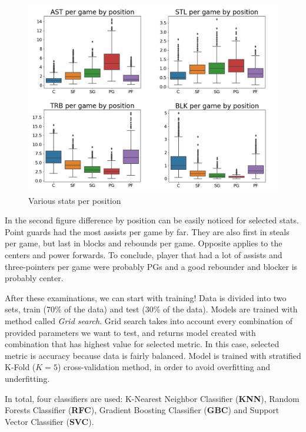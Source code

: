 \documentclass[a4paper]{article}
\begin{document}
\begin{figure}[h!]
\begin{center}
\includegraphics[width=1\textwidth]{per_pos_ast_stl_trb_blk.png}
\end{center}
\caption{Various stats per position}
\label{plt:pos_clf_data_boxplt2}
\end{figure}

In the second figure difference by position can be easily noticed for selected stats. Point guards had the most assists per game by far. They are also first in steals per game, but last in blocks and rebounds per game. Opposite applies to the centers and power forwards. To conclude, player that had a lot of assists and three-pointers per game were probably PGs and a good rebounder and blocker is probably center.

After these examinations, we can start with training! Data is divided into two sets, train (70\% of the data) and test (30\% of the data). Models are trained with method called \textit{Grid search}. Grid search takes into account every combination of provided parameters we want to test, and returns model created with combination that has highest value for selected metric. In this case, selected metric is accuracy because data is fairly balanced. Model is trained with stratified K-Fold ($K = 5$) cross-validation method, in order to avoid overfitting and underfitting.

In total, four classifiers are used: K-Nearest Neighbor Classifier (\textbf{KNN}), Random Forests Classifier (\textbf{RFC}), Gradient Boosting Classifier (\textbf{GBC}) and Support Vector Classifier (\textbf{SVC}).
\end{document}
